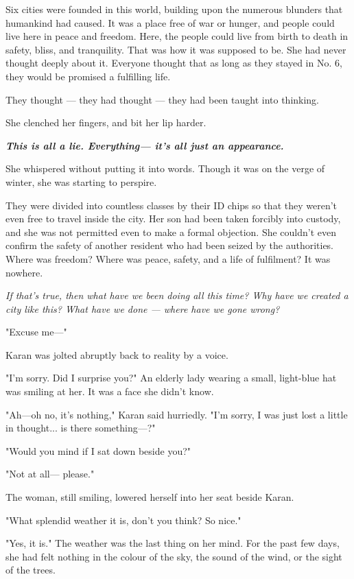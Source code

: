 Six cities were founded in this world, building upon the numerous
blunders that humankind had caused. It was a place free of war or
hunger, and people could live here in peace and freedom. Here, the
people could live from birth to death in safety, bliss, and tranquility.
That was how it was supposed to be. She had never thought deeply about
it. Everyone thought that as long as they stayed in No. 6, they would be
promised a fulfilling life.

They thought --- they had thought --- they had been taught into thinking.

She clenched her fingers, and bit her lip harder.

\textbf{\emph{This is all a lie. Everything--- it's all just an appearance.}}

She whispered without putting it into words. Though it was on the verge
of winter, she was starting to perspire.

They were divided into countless classes by their ID chips so that they
weren't even free to travel inside the city. Her son had been taken
forcibly into custody, and she was not permitted even to make a formal
objection. She couldn't even confirm the safety of another resident who
had been seized by the authorities. Where was freedom? Where was peace,
safety, and a life of fulfilment? It was nowhere.

\emph{If that's true, then what have we been doing all this time? Why have we
created a city like this? What have we done --- where have we gone wrong?}

"Excuse me---"

Karan was jolted abruptly back to reality by a voice.

"I'm sorry. Did I surprise you?" An elderly lady wearing a small,
light-blue hat was smiling at her. It was a face she didn't know.

"Ah---oh no, it's nothing," Karan said hurriedly. "I'm sorry, I was just
lost a little in thought... is there something---?"

"Would you mind if I sat down beside you?"

"Not at all--- please."

The woman, still smiling, lowered herself into her seat beside Karan.

"What splendid weather it is, don't you think? So nice."

"Yes, it is." The weather was the last thing on her mind. For the past
few days, she had felt nothing in the colour of the sky, the sound of
the wind, or the sight of the trees.

